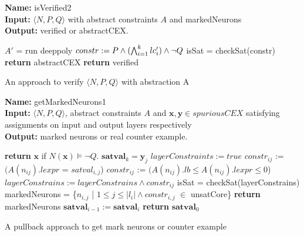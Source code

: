 \begin{algorithm}[t]
  \textbf{Name: } isVerified2 \\
  \textbf{Input: } $\langle N,P,Q \rangle$ with abstract constraints $A$ and markedNeurons \\
  \textbf{Output: } verified or  abstractCEX. 
  \begin{algorithmic}[1]
      \State $A'$ = run deeppoly
      \State $constr := P \land (\bigwedge_{i=1}^k lc'_i) \land \neg Q$ 
        \State isSat = checkSat(constr)
          \State \textbf{return} abstractCEX
        \EndIf
    \EndFor
    \State \textbf{return} verified
  \end{algorithmic}
  \caption{An approach to verify $\langle N,P,Q \rangle$ with abstraction A}
  \label{algo:verif2}
\end{algorithm}



\begin{algorithm}[t]
  \textbf{Name: } getMarkedNeurons1 \\
  \textbf{Input: } $\langle N,P,Q \rangle$, abstract constraints $A$ and $\boldsymbol{x}, \boldsymbol{y} \in spuriousCEX$ satisfying assignments on input and output layers respectively\\
  \textbf{Output: } marked neurons or real counter example. 
  \begin{algorithmic}[1]
    \State \textbf{return} $\boldsymbol{x}$ if $N(\boldsymbol{x}) \models \neg Q$. 
   \State $\boldsymbol{satval}_k = \boldsymbol{y}_j$
        \State $layerConstraints := true$
            \State $constr_{ij}$ := $(A(n_{ij}).lexpr$ = $satval_{i,j}$) 
          \Else
            \State $constr_{ij}$ := $(A(n_{ij}).lb \leq A(n_{ij}).lexpr \leq 0$)
          \EndIf
          \State $layerConstrains := layerConstrains \land constr_{ij}$
        \EndFor
        \State isSat = checkSat(layerConstrains)
          \State markedNeurons = \{$n_{i,j}$ | $1 \leq j\leq |l_i| \land constr_{i,j}$ $\in$ unsatCore\}
          \State \textbf{return } markedNeurons
        \EndIf
      \Else {}
        \State $\boldsymbol{satval}_{i-1} := \boldsymbol{satval}_i$
      \EndIf
   \EndFor
    \State \textbf{return} $\boldsymbol{satval}_0$ 
  \end{algorithmic}
  \caption{A pullback approach to get mark neurons or counter example}
  \label{algo:refine1}
\end{algorithm}


